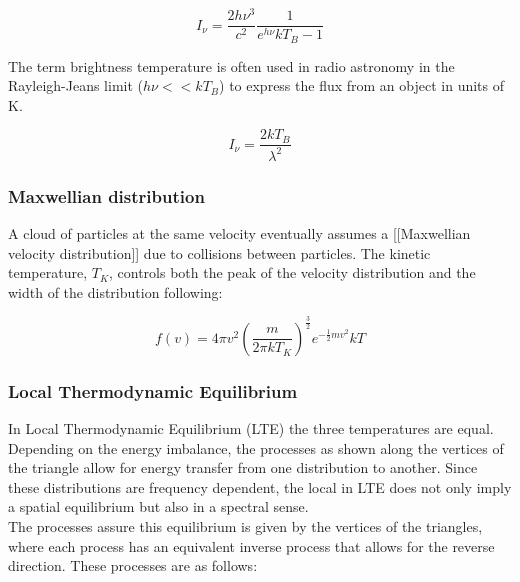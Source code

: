 \documentclass{article}
\begin{document}
\begin{equation} 
I_\nu = \frac{2h\nu^3}{c^2} \frac{1}{e^{h\nu}{kT_B}-1}
\end{equation}

The term brightness temperature is often used in radio astronomy in the Rayleigh-Jeans limit ($h\nu<<kT_B$)  to express the flux from an object in units of K. 

\begin{equation} 
I_\nu = \frac{2kT_B}{\lambda^2}
\end{equation}


\subsubsection{Maxwellian distribution} 
A cloud of particles at the same velocity eventually assumes a [[Maxwellian velocity distribution]] due to collisions between particles. The kinetic temperature, $T_K$, controls both the peak of the velocity distribution and the width of the distribution following: 

\begin{equation} 
f(v) = 4\pi v^2 (\frac{m}{2\pi kT_K})^\frac{3}{2} e^{-\frac{1}{2}mv^2}{kT}
\end{equation}  



\subsubsection{Local Thermodynamic Equilibrium} 
In Local Thermodynamic Equilibrium (LTE) the three temperatures are equal. Depending on the energy imbalance, the processes as shown along the vertices of the triangle allow for energy transfer from one distribution to another. Since these distributions are frequency dependent, the local in LTE does not only imply a spatial equilibrium but also in a spectral sense. \\ 

The processes assure this equilibrium is given by the vertices of the triangles, where each process has an equivalent inverse process that allows for the reverse direction. These processes are as follows: 
\end{document}
